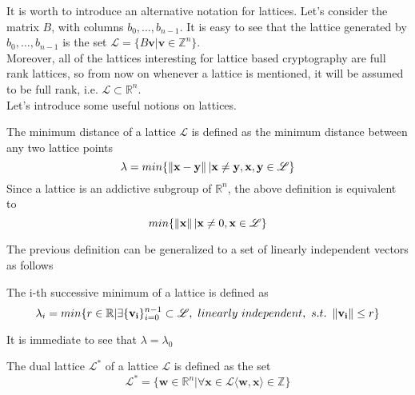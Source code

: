 It is worth to introduce an alternative notation for lattices. Let's consider the matrix $B$, with columns $b_0,\ldots,b_{n-1}$. It is easy to see that the lattice generated by $b_0,\ldots,b_{n-1}$ is the set $\mathscr{L}=\{B\mathbf{v}|\mathbf{v}\in\mathbb{Z}^n\}$.\\
Moreover, all of the lattices interesting for lattice based cryptography are full rank lattices, so from now on whenever a lattice is mentioned, it will be assumed to be full rank, i.e. $\mathscr{L}\subset\mathbb{R}^n$.\\
Let's introduce some useful notions on lattices.

\begin{definition}
The minimum distance of a lattice $\mathscr{L}$ is defined as the minimum distance between any two lattice points
\begin{equation*}
\lambda = min\{\left\lVert \mathbf{x}-\mathbf{y} \right\rVert|\mathbf{x}\ne \mathbf{y}, \mathbf{x},\mathbf{y}\in\mathscr{L}\}
\end{equation*}
Since a lattice is an addictive subgroup of $\mathbb{R}^n$, the above definition is equivalent to
\begin{equation*}
min\{\left\lVert \mathbf{x} \right\rVert|\mathbf{x}\ne0, \mathbf{x}\in\mathscr{L}\}
\end{equation*}
\end{definition}

The previous definition can be generalized to a set of linearly independent vectors as follows
\begin{definition}
The i-th successive minimum of a lattice is defined as 
\begin{equation*}
\lambda_i = min\{r \in \mathbb{R}|\exists \{\mathbf{v_i}\}_{i=0}^{n-1} \subset \mathscr{L},\text{ }linearly\text{ }independent,\text{ }s.t.\text{ }\left\lVert \mathbf{v_i} \right\rVert\leq r\}
\end{equation*}
\end{definition}

\begin{remark}
It is immediate to see that $\lambda=\lambda_0$
\end{remark}

\begin{definition}
The dual lattice $\mathscr{L}^*$ of a lattice $\mathscr{L}$ is defined as the set
\begin{equation*}
\mathscr{L}^*=\{\mathbf{w}\in\mathbb{R}^n|\forall\mathbf{x}\in\mathscr{L}\langle\mathbf{w},\mathbf{x}\rangle\in\mathbb{Z}\}
\end{equation*}
\end{definition} 


